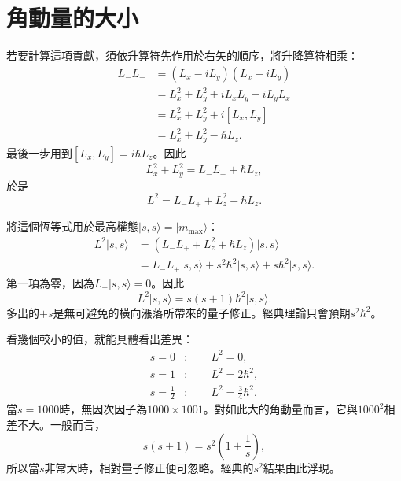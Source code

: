 \section{角動量的大小}

\begin{classroomqa}
\end{classroomqa}

若要計算這項貢獻，須依升算符先作用於右矢的順序，將升降算符相乘：
\begin{align}
L_-L_+
&=(L_x-iL_y)(L_x+iL_y) \\
&=L_x^2+L_y^2+iL_xL_y-iL_yL_x \\
&=L_x^2+L_y^2+i[L_x,L_y] \\
&=L_x^2+L_y^2-\hbar L_z.
\end{align}
最後一步用到\([L_x,L_y]=i\hbar L_z\)。因此
\begin{equation}
L_x^2+L_y^2=L_-L_++\hbar L_z,
\end{equation}
於是
\begin{equation}
L^2=L_-L_++L_z^2+\hbar L_z.
\end{equation}

將這個恆等式用於最高權態\(\lvert s,s\rangle=\lvert m_{\max}\rangle\)：
\begin{align}
L^2\lvert s,s\rangle
&=\left(L_-L_++L_z^2+\hbar L_z\right)\lvert s,s\rangle \\
&=L_-L_+\lvert s,s\rangle
+s^2\hbar^2\lvert s,s\rangle
+s\hbar^2\lvert s,s\rangle.
\end{align}
第一項為零，因為\(L_+\lvert s,s\rangle=0\)。因此
\begin{equation}
L^2\lvert s,s\rangle
=s(s+1)\hbar^2\lvert s,s\rangle.
\end{equation}
多出的\(+s\)是無可避免的橫向漲落所帶來的量子修正。經典理論只會預期\(s^2\hbar^2\)。

看幾個較小的值，就能具體看出差異：
\begin{align}
s=0 &: \qquad L^2=0,\\
s=1 &: \qquad L^2=2\hbar^2,\\
s=\frac12 &: \qquad L^2=\frac34\hbar^2.
\end{align}
當\(s=1000\)時，無因次因子為\(1000\times1001\)。對如此大的角動量而言，它與\(1000^2\)相差不大。一般而言，
\begin{equation}
s(s+1)=s^2\left(1+\frac1s\right),
\end{equation}
所以當\(s\)非常大時，相對量子修正便可忽略。經典的\(s^2\)結果由此浮現。

